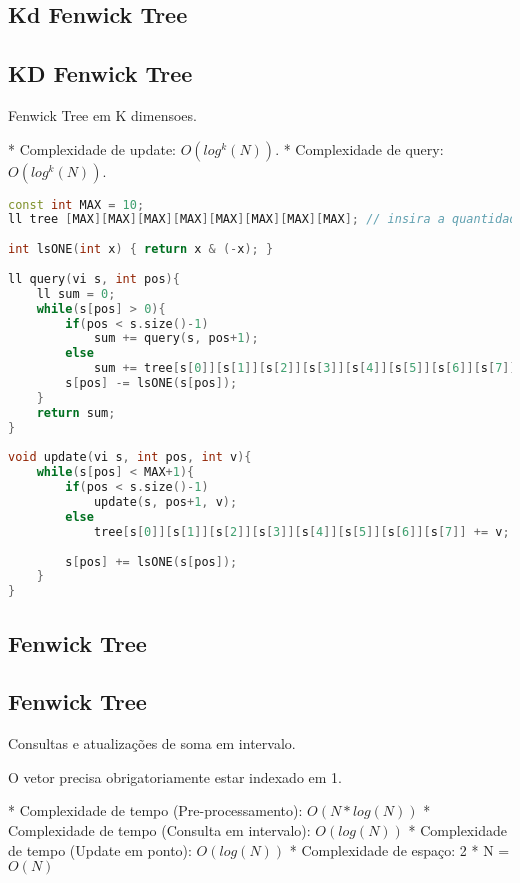 \documentclass[11pt, a4paper, twoside]{article}
\begin{document}
\subsection{Kd Fenwick Tree}


\subsection{KD Fenwick Tree}



Fenwick Tree em K dimensoes.

* Complexidade de update: $O(log^k(N))$.
* Complexidade de query: $O(log^k(N))$.
\begin{lstlisting}[language=C++]
const int MAX = 10;
ll tree [MAX][MAX][MAX][MAX][MAX][MAX][MAX][MAX]; // insira a quantidade necessaria de dimensoes
 
int lsONE(int x) { return x & (-x); } 
 
ll query(vi s, int pos){
    ll sum = 0;
    while(s[pos] > 0){
        if(pos < s.size()-1)
            sum += query(s, pos+1);
        else
            sum += tree[s[0]][s[1]][s[2]][s[3]][s[4]][s[5]][s[6]][s[7]];
        s[pos] -= lsONE(s[pos]);
    }
    return sum;
}
 
void update(vi s, int pos, int v){
    while(s[pos] < MAX+1){
        if(pos < s.size()-1)
            update(s, pos+1, v);
        else
            tree[s[0]][s[1]][s[2]][s[3]][s[4]][s[5]][s[6]][s[7]] += v;
            
        s[pos] += lsONE(s[pos]);
    }
}\end{lstlisting}

\subsection{Fenwick Tree}


\subsection{Fenwick Tree}



Consultas e atualizações de soma em intervalo.

O vetor precisa obrigatoriamente estar indexado em 1.

* Complexidade de tempo (Pre-processamento): $O(N * log(N))$
* Complexidade de tempo (Consulta em intervalo): $O(log(N))$
* Complexidade de tempo (Update em ponto): $O(log(N))$
* Complexidade de espaço: 2 * N = $O(N)$
\end{document}
